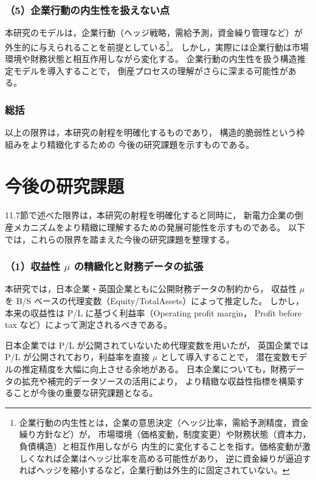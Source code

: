 \subsubsection*{（5）企業行動の内生性を扱えない点}

本研究のモデルは，企業行動（ヘッジ戦略，需給予測，資金繰り管理など）が
外生的に与えられることを前提としている\footnote{
企業行動の内生性とは，企業の意思決定（ヘッジ比率，需給予測精度，資金繰り方針など）が，
市場環境（価格変動，制度変更）や財務状態（資本力，負債構造）と相互作用しながら
内生的に変化することを指す。価格変動が激しくなれば企業はヘッジ比率を高める可能性があり，
逆に資金繰りが逼迫すればヘッジを縮小するなど，企業行動は外生的に固定されていない。
}。
しかし，実際には企業行動は市場環境や財務状態と相互作用しながら変化する。
企業行動の内生性を扱う構造推定モデルを導入することで，
倒産プロセスの理解がさらに深まる可能性がある。

\subsubsection*{総括}

以上の限界は，本研究の射程を明確化するものであり，
構造的脆弱性という枠組みをより精緻化するための
今後の研究課題を示すものである。


\section{今後の研究課題}

11.7節で述べた限界は，本研究の射程を明確化すると同時に，
新電力企業の倒産メカニズムをより精緻に理解するための発展可能性を示すものである。
以下では，これらの限界を踏まえた今後の研究課題を整理する。

\subsubsection*{（1）収益性 $\mu$ の精緻化と財務データの拡張}

本研究では，日本企業・英国企業ともに公開財務データの制約から，
収益性 $\mu$ を B/S ベースの代理変数（Equity/TotalAssets）によって推定した。
しかし，本来の収益性は P/L に基づく利益率（Operating profit margin，
Profit before tax など）によって測定されるべきである。

日本企業では P/L が公開されていないため代理変数を用いたが，
英国企業では P/L が公開されており，利益率を直接 $\mu$ として導入することで，
潜在変数モデルの推定精度を大幅に向上させる余地がある。
日本企業についても，財務データの拡充や補完的データソースの活用により，
より精緻な収益性指標を構築することが今後の重要な研究課題となる。

